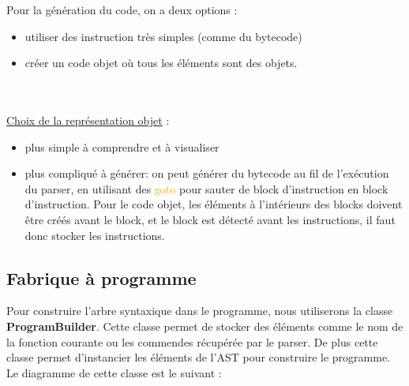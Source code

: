 \documentclass[a4paper]{article}%
\begin{document}
Pour la génération du code, on a deux options :
\begin{itemize}
  \item utiliser des instruction très simples (comme du \gls{bytecode})
\item créer un code objet où tous les éléments sont des objets.
\end{itemize}\leavevmode\\~\\

\underline{Choix de la représentation objet} :
\begin{itemize}
\item plus simple à comprendre et à visualiser
\item plus compliqué à générer: on peut générer du bytecode au fil de
  l'exécution du \gls{parser}, en utilisant des \textcolor{orange}{goto} pour sauter de block d'instruction en block d'instruction. Pour le code objet, les éléments à l'intérieurs des blocks doivent être créés avant le block, et le block est détecté avant les instructions, il faut donc stocker les instructions.
\end{itemize}


\clearpage{}

\subsection{Fabrique à programme}

Pour construire l'arbre syntaxique dans le programme, nous utiliserons
la classe \textbf{ProgramBuilder}. Cette classe permet de stocker des éléments
comme le nom de la fonction courante ou les commendes récupérée par le
\gls{parser}.
De plus cette classe permet d'instancier les éléments de l'AST pour construire
le programme. Le diagramme de cette classe est le suivant :
\end{document}
